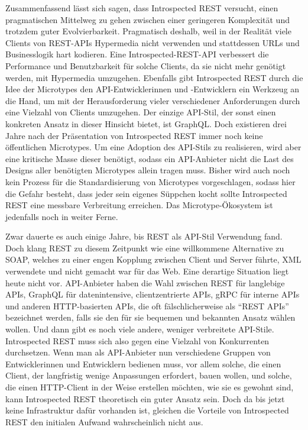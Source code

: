 \para{}Zusammenfassend lässt sich sagen, dass Introspected REST versucht, einen pragmatischen Mittelweg zu gehen zwischen einer geringeren Komplexität und trotzdem guter Evolvierbarkeit. Pragmatisch deshalb, weil in der Realität viele Clients von REST-APIs Hypermedia nicht verwenden und stattdessen URLs und Businesslogik hart kodieren. Eine Introspected-REST-API verbessert die Performance und Benutzbarkeit für solche Clients, da sie nicht mehr genötigt werden, mit Hypermedia umzugehen. Ebenfalls gibt Introspected REST durch die Idee der Microtypes den API-Entwicklerinnen und -Entwicklern ein Werkzeug an die Hand, um mit der Herausforderung vieler verschiedener Anforderungen durch eine Vielzahl von Clients umzugehen. Der einzige API-Stil, der sonst einen konkreten Ansatz in dieser Hinsicht bietet, ist GraphQL. Doch existieren drei Jahre nach der Präsentation von Introspected REST immer noch keine öffentlichen Microtypes. Um eine Adoption des API-Stils zu realisieren, wird aber eine kritische Masse dieser benötigt, sodass ein API-Anbieter nicht die Last des Designs aller benötigten Microtypes allein tragen muss. Bisher wird auch noch kein Prozess für die Standardisierung von Microtypes vorgeschlagen, sodass hier die Gefahr besteht, dass jeder sein eigenes Süppchen kocht \textendash{} sollte Introspected REST eine messbare Verbreitung erreichen. Das Microtype-Ökosystem ist jedenfalls noch in weiter Ferne.

Zwar dauerte es auch einige Jahre, bis REST als API-Stil Verwendung fand. Doch klang REST zu diesem Zeitpunkt wie eine willkommene Alternative zu SOAP, welches zu einer engen Kopplung zwischen Client und Server führte, XML verwendete und nicht gemacht war für das Web. Eine derartige Situation liegt heute nicht vor. API-Anbieter haben die Wahl zwischen REST für langlebige APIs, GraphQL für datenintensive, clientzentrierte APIs, gRPC für interne APIs und anderen HTTP-basierten APIs, die oft fälschlicherweise als \enquote{REST APIs} bezeichnet werden, falls sie den für sie bequemen und bekannten Ansatz wählen wollen. Und dann gibt es noch viele andere, weniger verbreitete API-Stile. Introspected REST muss sich also gegen eine Vielzahl von Konkurrenten durchsetzen. Wenn man als API-Anbieter nun verschiedene Gruppen von Entwicklerinnen und Entwicklern bedienen muss, vor allem solche, die einen Client, der langfristig wenige Anpassungen erfordert, bauen wollen, und solche, die einen HTTP-Client in der Weise erstellen möchten, wie sie es gewohnt sind, kann Introspected REST theoretisch ein guter Ansatz sein. Doch da bis jetzt keine Infrastruktur dafür vorhanden ist, gleichen die Vorteile von Introspected REST den initialen Aufwand wahrscheinlich nicht aus.


